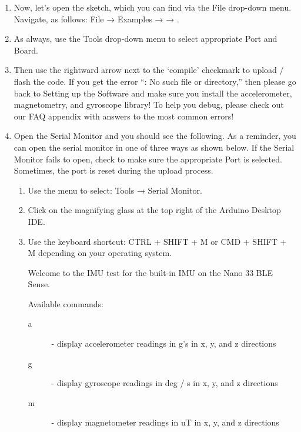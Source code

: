 \begin{enumerate}
  \item Now, let's open the  sketch, which you can find via the File drop-down menu. Navigate, as follows: File → Examples →  → .
  \item As always, use the Tools drop-down menu to select appropriate Port and Board.
  \item Then use the rightward arrow next to the ‘compile’ checkmark to upload / flash the code. If you get the error “: No such file or directory,” then please go back to Setting up the Software and make sure you install the accelerometer, magnetometry, and gyroscope library! To help you debug, please check out our FAQ appendix with answers to the most common errors!
  
  \item Open the Serial Monitor and you should see the following. As a reminder, you can open the serial monitor in one of three ways as shown below. If the Serial Monitor fails to open, check to make sure the appropriate Port is selected. Sometimes, the port is reset during the upload process.
   
    \begin{enumerate}
      \item Use the menu to select: Tools → Serial Monitor.
      \item Click on the magnifying glass at the top right of the Arduino Desktop IDE.
      \item Use the keyboard shortcut: CTRL + SHIFT + M or CMD + SHIFT + M depending on your operating system.
      
      
        Welcome to the IMU test for the built-in IMU on the Nano 33 BLE Sense.

        Available commands:
        
          \begin{description}
              \item[a] - display accelerometer readings in g's in x, y, and z directions
              \item[g] - display gyroscope readings in deg / s in x, y, and z directions
              \item[m] - display magnetometer readings in uT in x, y, and z directions
          \end{description}


\end{enumerate}
\end{enumerate}

